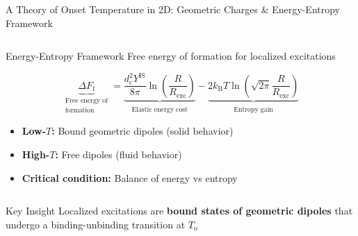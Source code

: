 \begin{frame}{A Theory of Onset Temperature in 2D: Geometric Charges \& Energy-Entropy Framework}
\begin{columns}[T]
\begin{column}[T]{0.5\textwidth}
\begin{block}{\centering \large Energy-Entropy Framework}
Free energy of formation for localized excitations
\end{block}

\vspace{0.3em}

\begin{equation*}
\underbrace{\Delta F_\mathrm{f}}_{\substack{\text{Free energy of} \\ \text{formation}}} = \underbrace{ \frac{d_{\mathrm{c}}^{2} Y^{\mathrm{IS}}}{8 \pi} \ln \left(\frac{R}{R_{\mathrm{exc}}}\right) }_{\substack{\text{Elastic energy cost}}} - \underbrace{2 k_\mathrm{B} T \ln \left(\sqrt{2 \pi} \frac{R}{R_\mathrm{exc}} \right)}_{\substack{\text{Entropy gain}}}
\end{equation*}

\vspace{0.5em}

\begin{itemize}
\item \textbf{Low-$T$:} Bound geometric dipoles (solid behavior)
\item \textbf{High-$T$:} Free dipoles (fluid behavior)  
\item \textbf{Critical condition:} Balance of energy vs entropy
\end{itemize}

\end{column}
\end{columns}

\vspace{0.5em}

\begin{block}{\centering Key Insight}
Localized excitations are \textbf{bound states of geometric dipoles} that undergo a binding-unbinding transition at $T_\mathrm{o}$
\end{block}

\end{frame}


